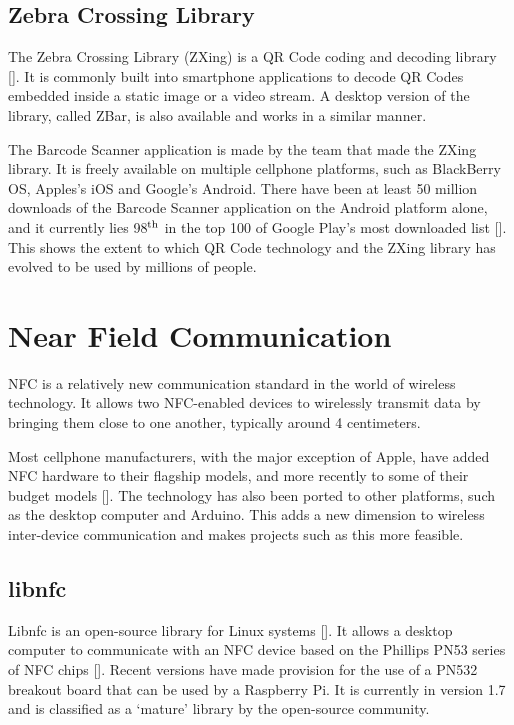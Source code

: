 \subsection{Zebra Crossing Library}
\label{sec:zbar}

The Zebra Crossing Library (ZXing) is a QR Code coding and decoding
library [\cite{website:zxing}]. It is commonly built into smartphone
applications to decode QR Codes embedded inside a static image or a video
stream. A desktop version of the library, called ZBar, is also available and
works in a similar manner.

The Barcode Scanner application is made by the team that made the ZXing
library. It is freely available on multiple cellphone platforms, such as
BlackBerry OS, Apples's iOS and Google's Android. There have been at least 50 million
downloads of the Barcode Scanner application on the Android platform alone, and it
currently lies 98$^{\rm th}$ in the top 100 of Google Play's most downloaded list
[\cite{website:barcodescanner}]. This shows the extent to which QR Code technology and
the ZXing library has evolved to be used by millions of people.

\section{Near Field Communication}

NFC is a relatively new communication standard in the world of
wireless technology. It allows two NFC-enabled devices to wirelessly transmit data by bringing
them close to one another, typically around 4 centimeters.

Most cellphone manufacturers, with the major exception of Apple, have
added NFC hardware to their flagship models, and more recently to some of
their budget models [\cite{website:nfc-models}]. The technology has also been
ported to other platforms, such as the desktop computer and Arduino. This adds a
new dimension to wireless inter-device communication and makes projects such as
this more feasible.

\subsection{libnfc}

Libnfc is an open-source library for Linux systems [\cite{website:libnfc}]. It allows a
desktop computer to communicate with an NFC device based on the Phillips PN53
series of NFC chips [\cite{website:libnfc-hardware}]. Recent versions have made provision
for the use of a PN532 breakout board that can be used by a Raspberry Pi. It is currently
in version 1.7 and is classified as a `mature' library by the open-source community.

